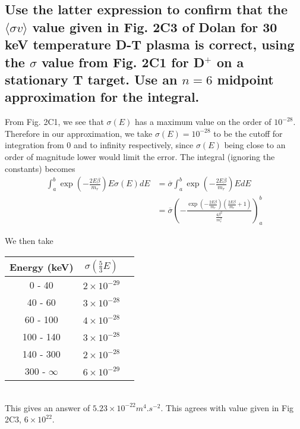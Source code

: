 \documentclass[answers]{exam}
\begin{document}
\begin{questions}
\begin{parts}
\part{Use the latter expression to confirm that the $\langle \sigma v \rangle$ value given in Fig. 2C3 of Dolan for 30 keV temperature D-T plasma is correct, using the $\sigma$ value from Fig. 2C1 for D$^+$ on a stationary T target. Use an $n = 6$ midpoint approximation for the integral.}

\begin{solution}
    From Fig. 2C1, we see that $\sigma(E)$ has a maximum value on the order of $10^{-28}$. Therefore in our approximation, we take $\sigma(E) = 10^{-28}$ to be the cutoff for integration from 0 and to infinity respectively, since $\sigma(E)$ being close to an order of magnitude lower would limit the error. The integral (ignoring the constants) becomes
    \begin{align*}
        \int_a^b \exp\left(-\frac{2E\beta}{m_r}\right)E\sigma(E)dE &= \overline{\sigma} \int_a^b \exp\left(-\frac{2E\beta}{m_r}\right) EdE \\
                                                                   &= \overline{\sigma} \left(-\frac{\exp\left(-\frac{2E\beta}{m_r}\right)\left(\frac{2E\beta}{m_r}+1\right)}{\frac{4\beta^2}{m_r^2}} \right)_a^b
    \end{align*}

    We then take \\
    \begin{tabular}{|c|c|c|}
        \hline
        Energy (keV) & $\sigma\left(\frac{5}{3}E\right)$ \\
        \hline\hline
        0 - 40 & $2 \times 10^{-29}$ \\
        \hline
        40 - 60 & $3 \times 10^{-28}$ \\
        \hline
        60 - 100 & $4 \times 10^{-28}$ \\
        \hline
        100 - 140 & $3 \times 10^{-28}$ \\
        \hline
        140 - 300 & $2 \times 10^{-28}$ \\
        \hline
        300 - $\infty$ & $6 \times 10^{-29}$ \\
        \hline
    \end{tabular} \\
    This gives an answer of $5.23 \times 10^{-22}\unit{m^4.s^{-2}}$. This agrees with value given in Fig 2C3, $6 \times 10^{22}$.
\end{solution}


\end{parts}
\end{questions}
\end{document}
